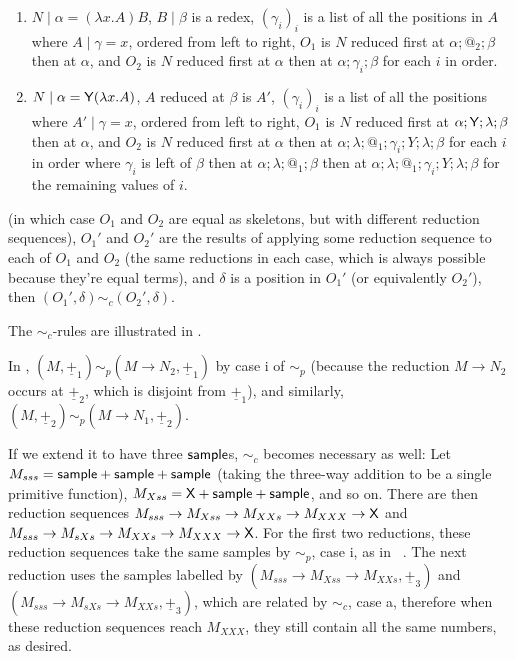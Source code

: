 \begin{definition}
\begin{enumerate}
\begin{enumerate}
        \item $N \mid \alpha = (\lambda x. A) B$, $B \mid \beta$ is a redex, $(\gamma_i)_i$ is a list of all the positions in $A$ where $A \mid \gamma = x$, ordered from left to right, $O_1$ is $N$ reduced first at $\alpha ; @_2 ; \beta$ then at $\alpha$, and $O_2$ is $N$ reduced first at $\alpha$ then at $\alpha;\gamma_i;\beta$ for each $i$ in order.
        
        \item $N \mid \alpha = \mathsf{Y} (\lambda x. A)$, $A$ reduced at $\beta$ is $A'$, $(\gamma_i)_i$ is a list of all the positions where $A' \mid \gamma  = x$, ordered from left to right, $O_1$ is $N$ reduced first at $\alpha;\mathsf{Y};\lambda;\beta$ then at $\alpha$, and $O_2$ is $N$ reduced first at $\alpha$ then at $\alpha;\lambda;@_1;\gamma_i;Y;\lambda;\beta$ for each $i$ in order where $\gamma_i$ is left of $\beta$ then at $\alpha;\lambda;@_1;\beta$ then at $\alpha;\lambda;@_1;\gamma_i;Y;\lambda;\beta$ for the remaining values of $i$.
    \end{enumerate}
    (in which case $O_1$ and $O_2$ are equal as skeletons, but with different reduction sequences), $O_1'$ and $O_2'$ are the results of applying some reduction sequence to each of $O_1$ and $O_2$ (the same reductions in each case, which is always possible because they're equal terms), and $\delta$ is a position in $O_1'$ (or equivalently $O_2'$), then $(O_1',\delta) \sim_c (O_2',\delta)$.
\end{enumerate}
The $\sim_c$-rules are illustrated in .
\end{definition}

\begin{example}
In , $(M,\underline{+}_1) \sim_p (M \to N_2,\underline{+}_1)$ by case i of $\sim_p$ (because the reduction $M \to N_2$ occurs at $\underline{+}_2$, which is disjoint from $\underline{+}_1$), and similarly, $(M,\underline{+}_2) \sim_p (M \to N_1,\underline{+}_2)$.

If we extend it to have three $\mathsf{sample}$s, $\sim_c$ becomes necessary as well: Let $M_{sss} = \mathsf{sample} + \mathsf{sample} + \mathsf{sample}$ (taking the three-way addition to be a single primitive function), $M_{Xss} = \mathsf{X} + \mathsf{sample} + \mathsf{sample}$, and so on. There are then reduction sequences $M_{sss} \to M_{Xss} \to M_{XXs} \to M_{XXX} \to \mathsf{X}$ and $M_{sss} \to M_{sXs} \to M_{XXs} \to M_{XXX} \to \mathsf{X}$. For the first two reductions, these reduction sequences take the same samples by $\sim_p$, case i, as in ~. The next reduction uses the samples labelled by $(M_{sss} \to M_{Xss} \to M_{XXs}, \underline{+}_3)$ and $(M_{sss} \to M_{sXs} \to M_{XXs}, \underline{+}_3)$, which are related by $\sim_c$, case a, therefore when these reduction sequences reach $M_{XXX}$, they still contain all the same numbers, as desired.
\end{example}

